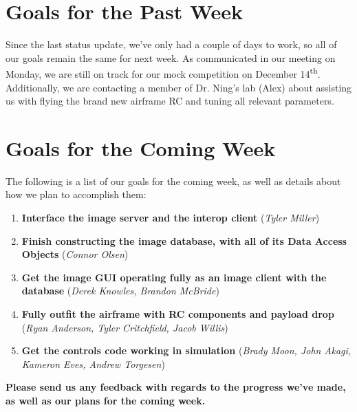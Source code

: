 \documentclass[]{../auvsi_doc}
\begin{document}
\section{Goals for the Past Week}

Since the last status update, we've only had a couple of days to work, so all of our goals remain the same for next week. As communicated in our meeting on Monday, we are still on track for our mock competition on December 14\textsuperscript{th}. Additionally, we are contacting a member of Dr. Ning's lab (Alex) about assisting us with flying the brand new airframe RC and tuning all relevant parameters.

\section{Goals for the Coming Week}

The following is a list of our goals for the coming week, as well as details about how we plan to accomplish them:

\begin{enumerate}
	\item \textbf{Interface the image server and the interop client} (\textit{Tyler Miller})
	\item \textbf{Finish constructing the image database, with all of its Data Access Objects} (\textit{Connor Olsen})
	\item \textbf{Get the image GUI operating fully as an image client with the database} (\textit{Derek Knowles, Brandon McBride})
	\item \textbf{Fully outfit the airframe with RC components and payload drop} (\textit{Ryan Anderson, Tyler Critchfield, Jacob Willis})
	\item \textbf{Get the controls code working in simulation} (\textit{Brady Moon, John Akagi, Kameron Eves, Andrew Torgesen})
\end{enumerate}

\textbf{Please send us any feedback with regards to the progress we've made, as well as our plans for the coming week.}

%
%
%
\end{document}
